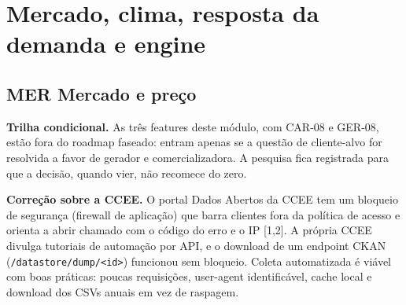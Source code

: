 
\section{Mercado, clima, resposta da demanda e engine}

\subsection{MER \textperiodcentered{} Mercado e preço}

\begin{nota}
\textbf{Trilha condicional.} As três features deste módulo, com CAR-08 e
GER-08, estão fora do roadmap faseado: entram apenas se a questão de
cliente-alvo for resolvida a favor de gerador e comercializadora. A pesquisa
fica registrada para que a decisão, quando vier, não recomece do zero.
\end{nota}

\begin{nota}
\textbf{Correção sobre a CCEE.} O portal Dados Abertos da CCEE tem um bloqueio
de segurança (firewall de aplicação) que barra clientes fora da política de
acesso e orienta a abrir chamado com o código do erro e o IP [1,2]. A própria
CCEE divulga tutoriais de automação por API, e o download de um endpoint
CKAN (\texttt{/datastore/dump/<id>}) funcionou sem bloqueio. Coleta
automatizada é viável com boas práticas: poucas requisições, user-agent
identificável, cache local e download dos CSVs anuais em vez de raspagem.
\end{nota}

